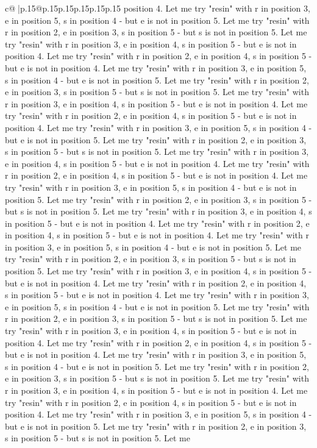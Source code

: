 \documentclass{article}
\begin{document}
{\begin{supertabular}{c@{$\;$}|p{.15\linewidth}@{}p{.15\linewidth}p{.15\linewidth}p{.15\linewidth}p{.15\linewidth}p{.15\linewidth}}
{{{position 4. Let me try "resin" with r in position 3, e in position 5, s in position 4 {-} but e is not in position 5. Let me try "resin" with r in position 2, e in position 3, s in position 5 {-} but s is not in position 5. Let me try "resin" with r in position 3, e in position 4, s in position 5 {-} but e is not in position 4. Let me try "resin" with r in position 2, e in position 4, s in position 5 {-} but e is not in position 4. Let me try "resin" with r in position 3, e in position 5, s in position 4 {-} but e is not in position 5. Let me try "resin" with r in position 2, e in position 3, s in position 5 {-} but s is not in position 5. Let me try "resin" with r in position 3, e in position 4, s in position 5 {-} but e is not in position 4. Let me try "resin" with r in position 2, e in position 4, s in position 5 {-} but e is not in position 4. Let me try "resin" with r in position 3, e in position 5, s in position 4 {-} but e is not in position 5. Let me try "resin" with r in position 2, e in position 3, s in position 5 {-} but s is not in position 5. Let me try "resin" with r in position 3, e in position 4, s in position 5 {-} but e is not in position 4. Let me try "resin" with r in position 2, e in position 4, s in position 5 {-} but e is not in position 4. Let me try "resin" with r in position 3, e in position 5, s in position 4 {-} but e is not in position 5. Let me try "resin" with r in position 2, e in position 3, s in position 5 {-} but s is not in position 5. Let me try "resin" with r in position 3, e in position 4, s in position 5 {-} but e is not in position 4. Let me try "resin" with r in position 2, e in position 4, s in position 5 {-} but e is not in position 4. Let me try "resin" with r in position 3, e in position 5, s in position 4 {-} but e is not in position 5. Let me try "resin" with r in position 2, e in position 3, s in position 5 {-} but s is not in position 5. Let me try "resin" with r in position 3, e in position 4, s in position 5 {-} but e is not in position 4. Let me try "resin" with r in position 2, e in position 4, s in position 5 {-} but e is not in position 4. Let me try "resin" with r in position 3, e in position 5, s in position 4 {-} but e is not in position 5. Let me try "resin" with r in position 2, e in position 3, s in position 5 {-} but s is not in position 5. Let me try "resin" with r in position 3, e in position 4, s in position 5 {-} but e is not in position 4. Let me try "resin" with r in position 2, e in position 4, s in position 5 {-} but e is not in position 4. Let me try "resin" with r in position 3, e in position 5, s in position 4 {-} but e is not in position 5. Let me try "resin" with r in position 2, e in position 3, s in position 5 {-} but s is not in position 5. Let me try "resin" with r in position 3, e in position 4, s in position 5 {-} but e is not in position 4. Let me try "resin" with r in position 2, e in position 4, s in position 5 {-} but e is not in position 4. Let me try "resin" with r in position 3, e in position 5, s in position 4 {-} but e is not in position 5. Let me try "resin" with r in position 2, e in position 3, s in position 5 {-} but s is not in position 5. Let me }}}
\end{supertabular}}
\end{document}
